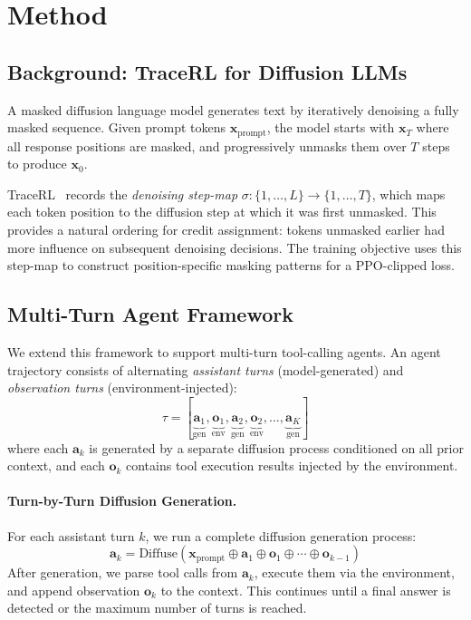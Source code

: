 \documentclass{article}
\begin{document}
\section{Method}

\subsection{Background: TraceRL for Diffusion LLMs}

A masked diffusion language model generates text by iteratively denoising a fully masked sequence. Given prompt tokens $\mathbf{x}_{\text{prompt}}$, the model starts with $\mathbf{x}_T$ where all response positions are masked, and progressively unmasks them over $T$ steps to produce $\mathbf{x}_0$.

TraceRL~\citep{tracerl2025} records the \emph{denoising step-map} $\sigma: \{1,\ldots,L\} \to \{1,\ldots,T\}$, which maps each token position to the diffusion step at which it was first unmasked. This provides a natural ordering for credit assignment: tokens unmasked earlier had more influence on subsequent denoising decisions. The training objective uses this step-map to construct position-specific masking patterns for a PPO-clipped loss.

\subsection{Multi-Turn Agent Framework}

We extend this framework to support multi-turn tool-calling agents. An agent trajectory consists of alternating \emph{assistant turns} (model-generated) and \emph{observation turns} (environment-injected):
\[
\tau = [\underbrace{\mathbf{a}_1}_{\text{gen}}, \underbrace{\mathbf{o}_1}_{\text{env}}, \underbrace{\mathbf{a}_2}_{\text{gen}}, \underbrace{\mathbf{o}_2}_{\text{env}}, \ldots, \underbrace{\mathbf{a}_K}_{\text{gen}}]
\]
where each $\mathbf{a}_k$ is generated by a separate diffusion process conditioned on all prior context, and each $\mathbf{o}_k$ contains tool execution results injected by the environment.

\paragraph{Turn-by-Turn Diffusion Generation.}
For each assistant turn $k$, we run a complete diffusion generation process:
\[
\mathbf{a}_k = \text{Diffuse}(\mathbf{x}_{\text{prompt}} \oplus \mathbf{a}_1 \oplus \mathbf{o}_1 \oplus \cdots \oplus \mathbf{o}_{k-1})
\]
After generation, we parse tool calls from $\mathbf{a}_k$, execute them via the environment, and append observation $\mathbf{o}_k$ to the context. This continues until a final answer is detected or the maximum number of turns is reached.
\end{document}

